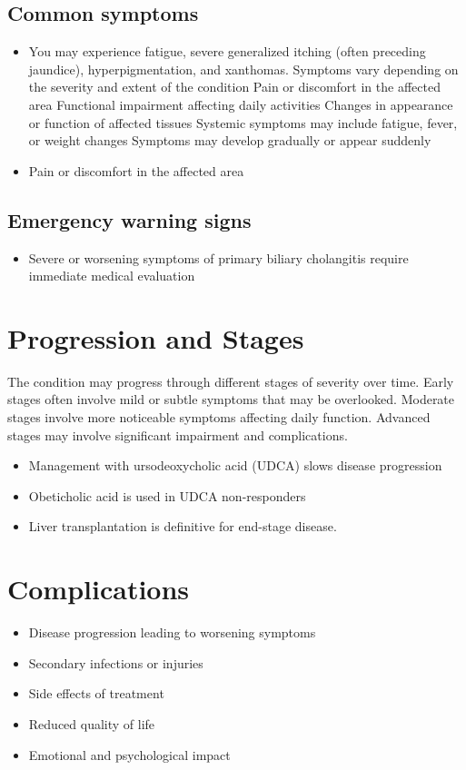 \subsection{Common symptoms}
\begin{itemize}[noitemsep]
  \item You may experience fatigue, severe generalized itching (often preceding jaundice), hyperpigmentation, and xanthomas. Symptoms vary depending on the severity and extent of the condition Pain or discomfort in the affected area Functional impairment affecting daily activities Changes in appearance or function of affected tissues Systemic symptoms may include fatigue, fever, or weight changes Symptoms may develop gradually or appear suddenly
  \item Pain or discomfort in the affected area
  \end{itemize}

\subsection{Emergency warning signs}
\begin{itemize}[noitemsep]
  \item Severe or worsening symptoms of primary biliary cholangitis require immediate medical evaluation
\end{itemize}
\section{Progression and Stages}
The condition may progress through different stages of severity over time. Early stages often involve mild or subtle symptoms that may be overlooked. Moderate stages involve more noticeable symptoms affecting daily function. Advanced stages may involve significant impairment and complications.

\begin{itemize}[noitemsep]
  \item Management with ursodeoxycholic acid (UDCA) slows disease progression
  \item Obeticholic acid is used in UDCA non-responders
  \item Liver transplantation is definitive for end-stage disease.
\end{itemize}
\section{Complications}
\begin{itemize}[noitemsep]
  \item Disease progression leading to worsening symptoms
  \item Secondary infections or injuries
  \item Side effects of treatment
  \item Reduced quality of life
  \item Emotional and psychological impact
\end{itemize}
